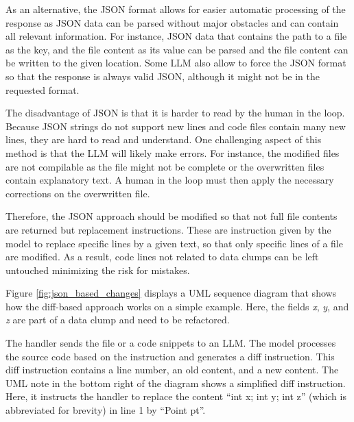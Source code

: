 As an alternative, the \ac{JSON} format allows for easier automatic processing of the response as \ac{JSON} data can be parsed without major obstacles and can contain all relevant information. For instance, \ac{JSON} data that contains the path to a file as the key, and the file content as its value can be parsed and the file content can be written to the given location. Some \acs{LLM} also allow to force the \ac{JSON} format so that the response is always valid \ac{JSON}, although it might not be in the requested format. 

The disadvantage of \ac{JSON} is that it is harder to read by the human in the loop. Because \ac{JSON} strings do not support new lines and code files contain many new lines, they are hard to read and understand.
One challenging aspect of this method is that the \ac{LLM} will likely make errors. For instance, the modified files are not compilable as the file might not be complete or the  overwritten files contain explanatory text. A human in the loop must then apply the necessary corrections on the overwritten file.



Therefore, the \ac{JSON} approach should be modified so that not full file contents are returned but replacement instructions. These are instruction given by the model to replace specific lines by a given text, so that only specific lines of a file are modified.  As a result, code lines not related to data clumps can be left untouched minimizing the risk for mistakes. 


Figure \ref{fig:json_based_changes} displays a \ac{UML} sequence diagram that shows how the diff-based approach works on a simple example. Here, the fields \textit{x}, \textit{y}, and \textit{z} are part of a data clump and need to be refactored. 

The handler sends the file or a code snippets to an \ac{LLM}. The model processes the source code based on the instruction and generates a diff instruction. This diff instruction contains a line number, an old content, and a new content. The \ac{UML} note in the bottom right of the diagram shows a simplified diff instruction. Here, it instructs the handler to replace the content \enquote{int x; int y; int z} (which is abbreviated for brevity) in line 1 by \enquote{Point pt}. 

